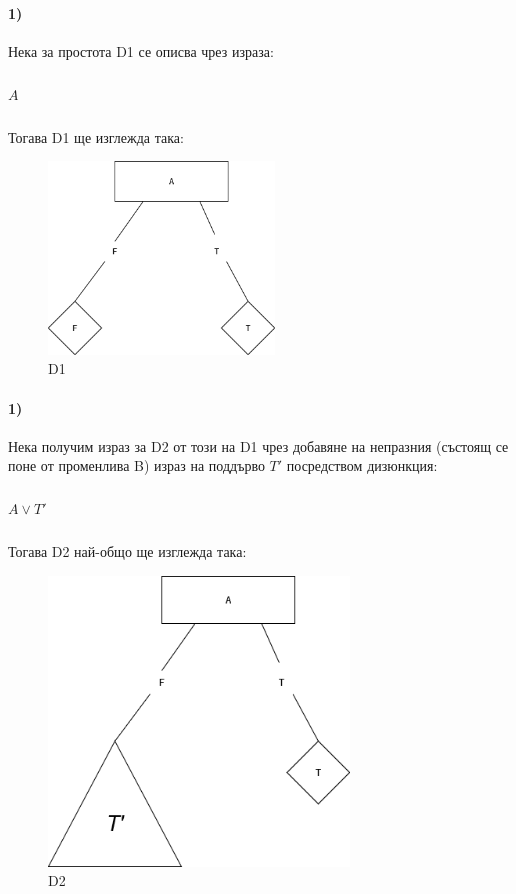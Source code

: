 \documentclass[12pt]{article}
\begin{document}
	\paragraph{1)} Нека за простота D1 се описва чрез израза:
	\subparagraph{}
	$A$
	\subparagraph{}
	Тогава D1 ще изглежда така:
	
	\begin{figure}[H]
		\centering
		\includegraphics[width=60mm]{Untitled Diagram8.png} 
		\caption{D1}
	\end{figure}
	
	\paragraph{1)} Нека получим израз за D2 от този на D1 чрез добавяне на непразния (състоящ се поне от променлива B) израз на поддърво $T'$ посредством дизюнкция:
	\subparagraph{}
	$A \lor T'$
	\subparagraph{}
	Тогава D2 най-общо ще изглежда така:
	
	\begin{figure}[H]
		\centering
		\includegraphics[width=80mm]{Untitled Diagram9.png} 
		\caption{D2}
	\end{figure}
	
\end{document}

